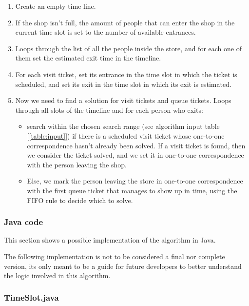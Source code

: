 \begin{enumerate}[topsep=0pt]
    \item Create an empty time line.
    \item If the shop isn't full, the amount of people that can enter the shop in the current time slot is set to the number of available entrances.
    \item Loops through the list of all the people inside the store, and for each one of them set the estimated exit time in the timeline.
    \item For each visit ticket, set its entrance in the time slot in which the ticket is scheduled, and set its exit in the time slot in which its exit is estimated.
    \item Now we need to find a solution for visit tickets and queue tickets.\newline
          Loops through all slots of the timeline and for each person who exits:
          \begin{itemize}
              \item search within the chosen search range (see algorithm input table [\ref{table:input}]) if there is a scheduled visit ticket whose one-to-one correspondence hasn't already been solved.\newline
              If a visit ticket is found, then we consider the ticket solved, and we set it in one-to-one correspondence with the person leaving the shop.
              \item Else, we mark the person leaving the store in one-to-one correspondence with the first queue ticket that manages to show up in time, using the FIFO rule to decide which to solve.
          \end{itemize}
\end{enumerate}

\subsubsection{Java code}
\label{subsubsect:javacode}

This section shows a possible implementation of the algorithm in Java.

The following implementation is not to be considered a final nor complete version, its only meant to be a guide for future developers to better understand the logic involved in this algorithm.

\subsubsection*{TimeSlot.java}
\label{subsubsect:timeslotjava}

